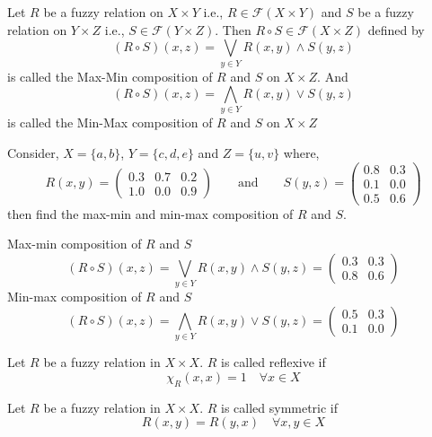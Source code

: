 \documentclass[../main-sheet.tex]{subfiles}
\begin{document}
\begin{defn}
    Let \(R \) be a fuzzy relation on \(X\times Y \) i.e., \(R\in\mathcal{F }(X\times Y )\) and \(S \) be a fuzzy relation on \(Y\times Z \) i.e., \(S\in \mathcal{F }(Y\times Z )\). Then \(R\circ S \in \mathcal{F }(X\times Z)\) defined by
    \[(R\circ S)(x,z)=\bigvee_{y\in Y }R(x,y)\wedge S(y,z )\]
    is called the Max-Min composition of \(R \) and \(S \) on \(X\times Z \). And \[(R\circ S)(x,z)=\bigwedge_{y\in Y }R(x,y)\vee S(y,z )\] is called the Min-Max composition of \(R \) and \(S \) on \(X\times Z \)
\end{defn}
\begin{prob}
    Consider, \(X=\{a,b \}\), \(Y=\{c,d,e \} \) and \(Z=\{u,v \}\) where,
    \[R(x,y)=\begin{pmatrix}
        0.3 & 0.7 & 0.2\\[.2em]
        1.0 & 0.0 & 0.9
    \end{pmatrix}\qquad \text{and}\qquad S(y,z)=\begin{pmatrix}
        0.8 & 0.3 \\[.2em]
        0.1 & 0.0 \\[.2em]
        0.5 & 0.6 
    \end{pmatrix}\]
    then find the max-min and min-max composition of \(R \) and \(S \).
\end{prob}
\begin{soln}
    Max-min composition of \(R \) and \(S \)
    \[(R\circ S)(x,z)=\bigvee_{y\in Y}R(x,y)\wedge S(y,z)=\begin{pmatrix}
        0.3&0.3\\[.25em]
        0.8&0.6
    \end{pmatrix}\]
    Min-max composition of \(R \) and \(S \)
    \[(R\circ S)(x,z)=\bigwedge_{y\in Y}R(x,y)\vee S(y,z)=\begin{pmatrix}
        0.5 & 0.3\\[.25em]
        0.1 & 0.0
    \end{pmatrix}\]
\end{soln}
\begin{defn}[Reflexive]
    Let \(R \)  be a fuzzy relation in \(X\times X \). \(R \) is called reflexive if 
    \[\chi_R (x,x)=1\quad \forall x\in X\]
\end{defn}
\begin{defn}[Symmetic]
    Let \(R \)  be a fuzzy relation in \(X\times X \). \(R \) is called symmetric if 
    \[R (x,y)=R(y,x)\quad \forall x,y \in X\]
\end{defn}
\end{document}
